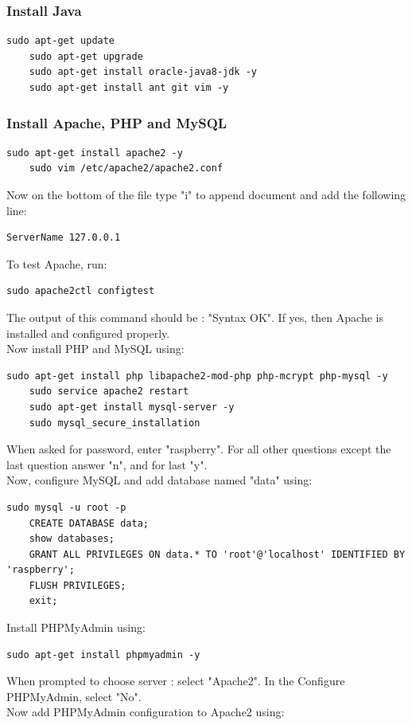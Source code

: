\documentclass{article}
\begin{document}
\subsubsection*{Install Java}
\begin{lstlisting}[style=BashInputStyle]
    sudo apt-get update
    sudo apt-get upgrade
    sudo apt-get install oracle-java8-jdk -y
    sudo apt-get install ant git vim -y
\end{lstlisting}
\subsubsection*{Install Apache, PHP and MySQL}
\begin{lstlisting}[style=BashInputStyle]
    sudo apt-get install apache2 -y
    sudo vim /etc/apache2/apache2.conf
\end{lstlisting}
Now on the bottom of the file type "i" to append document and add the following line:
\begin{lstlisting}[style=BashInputStyle]
    ServerName 127.0.0.1
\end{lstlisting}
To test Apache, run:
\begin{lstlisting}[style=BashInputStyle]
    sudo apache2ctl configtest
\end{lstlisting}
The output of this command should be : "Syntax OK". If yes, then Apache is installed and configured properly. \\Now install PHP and MySQL using:
\begin{lstlisting}[style=BashInputStyle]
    sudo apt-get install php libapache2-mod-php php-mcrypt php-mysql -y
    sudo service apache2 restart
    sudo apt-get install mysql-server -y
    sudo mysql_secure_installation
\end{lstlisting}
When asked for password, enter "raspberry". For all other questions except the last question answer "n", and for last "y".\\
Now, configure MySQL and add database named "data" using:
\begin{lstlisting}[style=BashInputStyle]
    sudo mysql -u root -p
    CREATE DATABASE data;
    show databases;
    GRANT ALL PRIVILEGES ON data.* TO 'root'@'localhost' IDENTIFIED BY 'raspberry';
    FLUSH PRIVILEGES;
    exit;
\end{lstlisting}
Install PHPMyAdmin using:
\begin{lstlisting}[style=BashInputStyle]
    sudo apt-get install phpmyadmin -y
\end{lstlisting}
When prompted to choose server : select "Apache2". In the Configure PHPMyAdmin, select "No".\\ Now add PHPMyAdmin configuration to Apache2 using:
\end{document}
